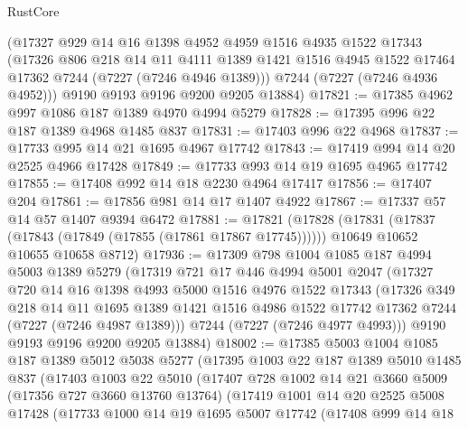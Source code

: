 \begin{lexlean}{RustCore}
\begin{coremodule}
      (@17327
        @929
        @14
        @16
        @1398
        @4952
        @4959
        @1516
        @4935
        @1522
        @17343
        (@17326
          @806
          @218
          @14
          @11
          @4111
          @1389
          @1421
          @1516
          @4945
          @1522
          @17464
          @17362
          @7244
          (@7227 (@7246 @4946 @1389)))
        @7244
        (@7227 (@7246 @4936 @4952)))
      @9190
      @9193
      @9196
      @9200
      @9205
      @13884)
@17821 := @17385 @4962 @997 @1086 @187 @1389 @4970 @4994 @5279
@17828 := @17395 @996 @22 @187 @1389 @4968 @1485 @837
@17831 := @17403 @996 @22 @4968
@17837 := @17733 @995 @14 @21 @1695 @4967 @17742
@17843 := @17419 @994 @14 @20 @2525 @4966 @17428
@17849 := @17733 @993 @14 @19 @1695 @4965 @17742
@17855 := @17408 @992 @14 @18 @2230 @4964 @17417
@17856 := @17407 @204
@17861 := @17856 @981 @14 @17 @1407 @4922
@17867 := @17337 @57 @14 @57 @1407 @9394 @6472
@17881 := @17821
    (@17828
      (@17831 (@17837 (@17843 (@17849 (@17855 (@17861 @17867 @17745))))))
      @10649
      @10652
      @10655
      @10658
      @8712)
@17936 := @17309
    @798
    @1004
    @1085
    @187
    @4994
    @5003
    @1389
    @5279
    (@17319
      @721
      @17
      @446
      @4994
      @5001
      @2047
      (@17327
        @720
        @14
        @16
        @1398
        @4993
        @5000
        @1516
        @4976
        @1522
        @17343
        (@17326
          @349
          @218
          @14
          @11
          @1695
          @1389
          @1421
          @1516
          @4986
          @1522
          @17742
          @17362
          @7244
          (@7227 (@7246 @4987 @1389)))
        @7244
        (@7227 (@7246 @4977 @4993)))
      @9190
      @9193
      @9196
      @9200
      @9205
      @13884)
@18002 := @17385
    @5003
    @1004
    @1085
    @187
    @1389
    @5012
    @5038
    @5277
    (@17395
      @1003
      @22
      @187
      @1389
      @5010
      @1485
      @837
      (@17403
        @1003
        @22
        @5010
        (@17407
          @728
          @1002
          @14
          @21
          @3660
          @5009
          (@17356 @727 @3660 @13760 @13764)
          (@17419
            @1001
            @14
            @20
            @2525
            @5008
            @17428
            (@17733
              @1000
              @14
              @19
              @1695
              @5007
              @17742
              (@17408
                @999
                @14
                @18

\end{coremodule}
\end{lexlean}
